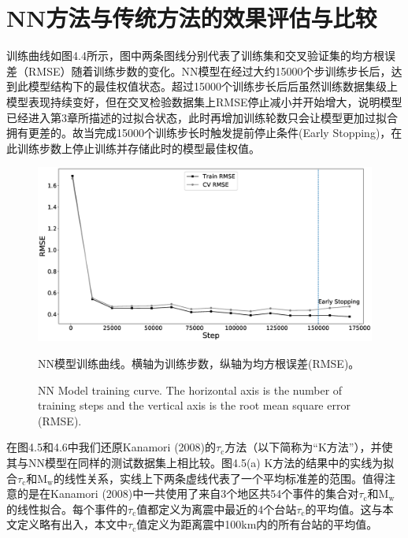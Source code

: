 \section{NN方法与传统方法的效果评估与比较}
\indent 训练曲线如图4.4所示，图中两条图线分别代表了训练集和交叉验证集的均方根误差（RMSE）随着训练步数的变化。NN模型在经过大约15000个步训练步长后，达到此模型结构下的最佳权值状态。超过15000个训练步长后后虽然训练数据集级上模型表现持续变好，但在交叉检验数据集上RMSE停止减小并开始增大，说明模型已经进入第3章所描述的过拟合状态，此时再增加训练轮数只会让模型更加过拟合拥有更差的。故当完成15000个训练步长时触发提前停止条件(Early Stopping)，在此训练步数上停止训练并存储此时的模型最佳权值。\\
\begin{figure}[!h] 
\centering 
 \includegraphics[width=0.9\linewidth]{img/6.eps} 
 \renewcommand{\figurename}{图} 
\caption{NN模型训练曲线。横轴为训练步数，纵轴为均方根误差(RMSE)。} 
\addtocounter{figure}{-1} \vspace{-5pt} 
\renewcommand{\figurename}{Fig} 
\caption{NN Model training curve. The horizontal axis is the number of training steps and the vertical axis is the root mean square error (RMSE).} 
\renewcommand{\figurename}{图} 
\label{fig:network-device-influence.png} 
\end{figure}
\indent 在图4.5和4.6中我们还原Kanamori (2008)的$\tau_{\mathrm{c}}$方法（以下简称为“K方法”），并使其与NN模型在同样的测试数据集上相比较。图4.5(a) K方法的结果中的实线为拟合$\tau_{\mathrm{c}}$和$\mathrm{M}_{\mathrm{w}}$的线性关系，实线上下两条虚线代表了一个平均标准差的范围。值得注意的是在Kanamori (2008)中一共使用了来自3个地区共54个事件的集合对$\tau_{\mathrm{c}}$和$\mathrm{M}_{\mathrm{w}}$的线性拟合。每个事件的$\tau_{\mathrm{c}}$值都定义为离震中最近的4个台站$\tau_{\mathrm{c}}$的平均值。这与本文定义略有出入，本文中$\tau_{\mathrm{c}}$值定义为距离震中100km内的所有台站的平均值。\\
